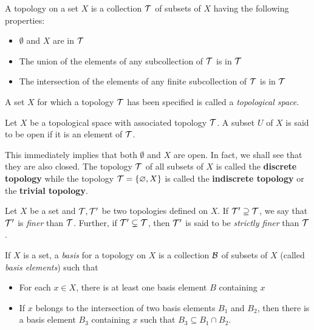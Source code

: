 \begin{definition}
    A topology on a set $X$ is a collection $\mathcal{T}$ of subsets of $X$ having the following properties:
    \begin{itemize}
        \item $\emptyset$ and $X$ are in $\mathcal{T}$ 
        \item The union of the elements of any subcollection of $\mathcal{T}$ is in $\mathcal{T}$ 
        \item The intersection of the elements of any finite subcollection of $\mathcal{T}$ is in $\mathcal{T}$
    \end{itemize}
    A set $X$ for which a topology $\mathcal{T}$ has been specified is called a \textit{topological space}.
\end{definition}

\begin{definition}
    Let $X$ be a topological space with associated topology $\mathcal{T}$. A subset $U$ of $X$ is said to be open if it is an element of $\mathcal{T}$.
\end{definition}
This immediately implies that both $\emptyset$ and $X$ are open. In fact, we shall see that they are also closed. The topology $\mathcal{T}$ of all subsets of $X$ is called the \textbf{discrete topology} while the topology $\mathcal{T} = \{\varnothing, X\}$ is called the \textbf{indiscrete topology} or the \textbf{trivial topology}.

\begin{definition}
    Let $X$ be a set and $\mathcal{T}, \mathcal{T}'$ be two topologies defined on $X$. If $\mathcal{T}'\supseteq\mathcal{T}$, we say that $\mathcal{T}'$ is \textit{finer} than $\mathcal{T}$. Further, if $\mathcal{T}'\subsetneq\mathcal{T}$, then $\mathcal{T}'$ is said to be \textit{strictly finer} than $\mathcal{T}$.
\end{definition}

\begin{definition}[Basis]
    If $X$ is a set, a \textit{basis} for a topology on $X$ is a collection $\mathcal{B}$ of subsets of $X$ (called \textit{basis elements}) such that 
    \begin{itemize}
        \item For each $x\in X$, there is at least one basis element $B$ containing $x$
        \item If $x$ belongs to the intersection of two basis elements $B_1$ and $B_2$, then there is a basis element $B_3$ containing $x$ such that $B_3\subseteq B_1\cap B_2$.
    \end{itemize}
\end{definition}

